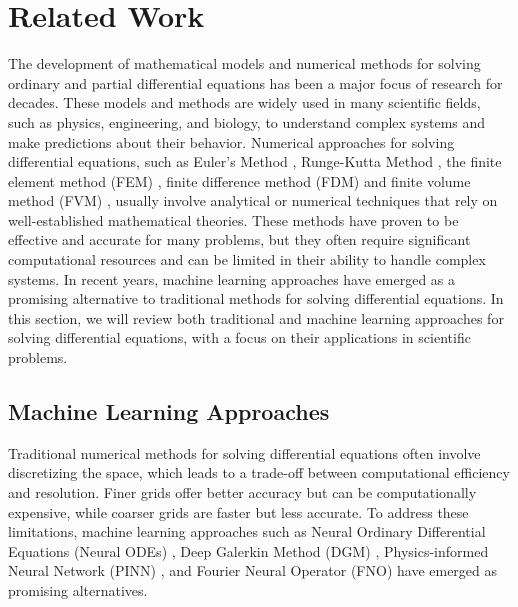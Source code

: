 \section{Related Work}
The development of mathematical models and numerical methods for solving ordinary and partial differential equations has been a major focus of research for decades. These models and methods are widely used in many scientific fields, such as physics, engineering, and biology, to understand complex systems and make predictions about their behavior. Numerical approaches for solving differential equations, such as Euler's Method \cite{euler1952methodus}, Runge-Kutta Method \cite{runge1895numerische}, the finite element method (FEM) \cite{herrmann1967finite}, finite difference method (FDM) \cite{richardson1911ix} and finite volume method (FVM) \cite{eymard2000finite}, usually involve analytical or numerical techniques that rely on well-established mathematical theories.
These methods have proven to be effective and accurate for many problems, but they often require significant computational resources and can be limited in their ability to handle complex systems. In recent years, machine learning approaches have emerged as a promising alternative to traditional methods for solving differential equations. In this section, we will review both traditional and machine learning approaches for solving differential equations, with a focus on their applications in scientific problems.


\subsection{Machine Learning Approaches}

Traditional numerical methods for solving differential equations often involve discretizing the space, which leads to a trade-off between computational efficiency and resolution. Finer grids offer better accuracy but can be computationally expensive, while coarser grids are faster but less accurate. To address these limitations, machine learning approaches such as Neural Ordinary Differential Equations (Neural ODEs) \cite{chen2018neural}, Deep Galerkin Method (DGM) \cite{sirignano2018dgm}, Physics-informed Neural Network (PINN) \cite{raissi2019physics}, and Fourier Neural Operator (FNO) have emerged as promising alternatives.

